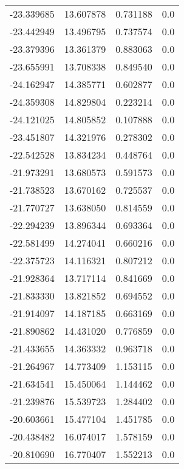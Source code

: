 \begin{tabular}{rrrr}
      -23.339685 &        13.607878 &    0.731188 &   0.0 \\
      -23.442949 &        13.496795 &    0.737574 &   0.0 \\
      -23.379396 &        13.361379 &    0.883063 &   0.0 \\
      -23.655991 &        13.708338 &    0.849540 &   0.0 \\
      -24.162947 &        14.385771 &    0.602877 &   0.0 \\
      -24.359308 &        14.829804 &    0.223214 &   0.0 \\
      -24.121025 &        14.805852 &    0.107888 &   0.0 \\
      -23.451807 &        14.321976 &    0.278302 &   0.0 \\
      -22.542528 &        13.834234 &    0.448764 &   0.0 \\
      -21.973291 &        13.680573 &    0.591573 &   0.0 \\
      -21.738523 &        13.670162 &    0.725537 &   0.0 \\
      -21.770727 &        13.638050 &    0.814559 &   0.0 \\
      -22.294239 &        13.896344 &    0.693364 &   0.0 \\
      -22.581499 &        14.274041 &    0.660216 &   0.0 \\
      -22.375723 &        14.116321 &    0.807212 &   0.0 \\
      -21.928364 &        13.717114 &    0.841669 &   0.0 \\
      -21.833330 &        13.821852 &    0.694552 &   0.0 \\
      -21.914097 &        14.187185 &    0.663169 &   0.0 \\
      -21.890862 &        14.431020 &    0.776859 &   0.0 \\
      -21.433655 &        14.363332 &    0.963718 &   0.0 \\
      -21.264967 &        14.773409 &    1.153115 &   0.0 \\
      -21.634541 &        15.450064 &    1.144462 &   0.0 \\
      -21.239876 &        15.539723 &    1.284402 &   0.0 \\
      -20.603661 &        15.477104 &    1.451785 &   0.0 \\
      -20.438482 &        16.074017 &    1.578159 &   0.0 \\
      -20.810690 &        16.770407 &    1.552213 &   0.0 \\

\end{tabular}
